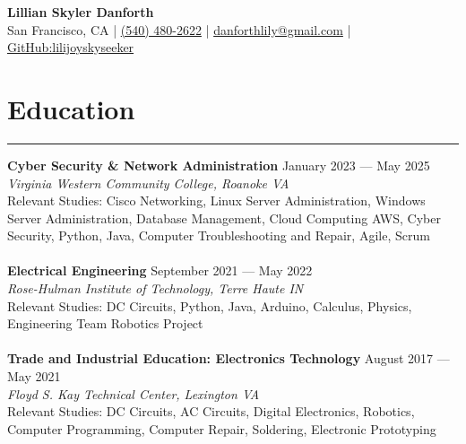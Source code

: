 \documentclass[a4paper,11pt]{article}
\begin{document}
\begin{center}
    {\LARGE \textbf{Lillian Skyler Danforth}} \\
    \vspace{0.2cm}
    \small
    San Francisco, CA | \href{tel:+15404802622}{(540) 480-2622} | \href{mailto:danforthlily@gmail.com}{danforthlily@gmail.com} | \href{https://github.com/lilijoyskyseeker}{GitHub:lilijoyskyseeker} \\
    \vspace{-0.4cm}
\end{center}
    
\section*{\hspace*{1em} Education}
\vspace{-0.2cm}
\hrule
\vspace{0.3cm}
\textbf{\hspace*{1em}Cyber Security \& Network Administration}
\hfill January 2023 — May 2025 \\
\textit{Virginia Western Community College, Roanoke VA} \\
Relevant Studies: Cisco Networking, Linux Server Administration, Windows Server Administration, Database Management, Cloud Computing AWS, Cyber Security, Python, Java, Computer Troubleshooting and Repair, Agile, Scrum \\
\vspace{-0.3cm} \\
\textbf{\hspace*{1em}Electrical Engineering}
\hfill September 2021 — May 2022 \\
\textit{Rose-Hulman Institute of Technology, Terre Haute IN} \\
Relevant Studies: DC Circuits, Python, Java, Arduino, Calculus, Physics, Engineering Team Robotics Project \\
\vspace{-0.3cm} \\
\textbf{\hspace*{1em}Trade and Industrial Education: Electronics Technology}
\hfill August 2017 — May 2021 \\
\textit{Floyd S. Kay Technical Center, Lexington VA} \\
Relevant Studies: DC Circuits, AC Circuits, Digital Electronics, Robotics, Computer Programming, Computer Repair, Soldering, Electronic Prototyping\\
\end{document}
